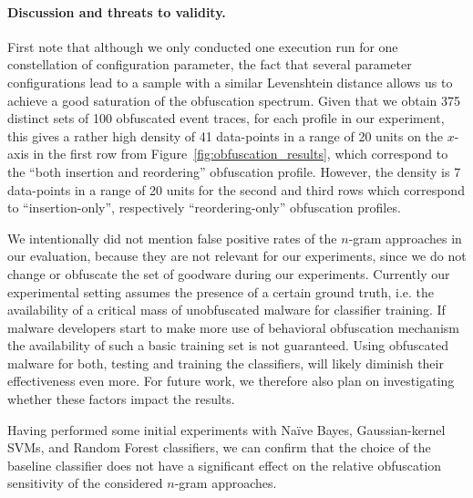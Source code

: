 \documentclass{llncs}
\newcommand{\done}[1]{}
\begin{document}
\paragraph{Discussion and threats to validity.}
First note that although we only conducted one execution run for one constellation 
of configuration parameter, the fact that several parameter configurations 
lead to a sample with a similar Levenshtein distance allows us to achieve a 
good saturation of the obfuscation spectrum. Given that we obtain 375 distinct 
sets of 100 obfuscated event traces, for each profile in our experiment, this gives a 
rather high density of 41 data-points in a range of 20 units on the $x$-axis in the first row from Figure~\ref{fig:obfuscation_results}, which correspond to the ``both insertion and reordering'' obfuscation profile. However, the density is 7 data-points in a range of 20 units for the second and third rows which correspond to ``insertion-only'', respectively ``reordering-only'' obfuscation profiles.
\done{TW: make point more clear that we did not need more runs as we were mainly interested in the obfuscation effects and not so much in the causing parameters and the same effect could be achieved by a variety of different configuration settings}




We intentionally did not mention false positive rates of the $n$-gram approaches in our evaluation, because they are not relevant for our experiments, since we do not change or obfuscate the set of goodware during our experiments. Currently our experimental setting assumes the presence of a certain ground truth, i.e. the availability of a critical mass of unobfuscated malware for classifier training. If malware developers start to make more use of behavioral obfuscation mechanism the availability of such a basic training set is not guaranteed. Using obfuscated malware for both, testing and training the classifiers, will likely diminish their effectiveness even more. For future work, we therefore also plan on investigating whether these factors impact the results. 


Having performed some initial experiments with Na{\"i}ve Bayes, Gaussian-kernel SVMs, and Random Forest classifiers, we can confirm that the choice of the baseline classifier does not have a significant effect on the relative obfuscation sensitivity of the considered $n$-gram approaches.
\end{document}
